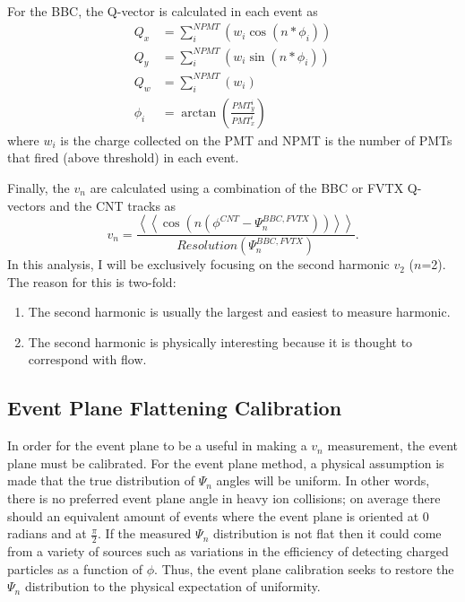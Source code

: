 For the BBC, the Q-vector is calculated in each event as
\begin{align}
Q_x &= \sum^{NPMT}_i( w_i \cos(n * \phi_i)) \\
Q_y &= \sum^{NPMT}_i( w_i \sin(n * \phi_i)) \\
Q_w &= \sum^{NPMT}_i( w_i ) \\
\phi_i &= \arctan(\frac{PMT_{y}^i}{PMT_{x}^i}) 
\label{eqn:bbc_ep_eqns}
\end{align}
where $w_i$ is the charge collected on the PMT and NPMT is the number of PMTs that fired (above threshold) in each event.

Finally, the $v_n$ are calculated using a combination of the BBC or FVTX Q-vectors and the CNT tracks as
\begin{equation}
v_n = \frac{\left<\left<\cos(n(\phi^{CNT} - \Psi^{BBC,FVTX}_n))\right>\right>}{Resolution(\Psi^{BBC,FVTX}_n)}.
\end{equation}
In this analysis, I will be exclusively focusing on the second harmonic $v_2$ ($n$=2). The reason for this is two-fold:
\begin{enumerate}
	\item{The second harmonic is usually the largest and easiest to measure harmonic.}
	\item{The second harmonic is physically interesting because it is thought to correspond with flow.}
\end{enumerate}
\subsection{Event Plane Flattening Calibration}
In order for the event plane to be a useful in making a $v_n$ measurement, the event plane must be calibrated. For the event plane method, a physical assumption is made that the true
distribution of $\Psi_n$ angles will be uniform. In other words, there is no preferred event plane angle in heavy ion collisions; on average there should an equivalent amount of events where the
event plane is oriented at 0 radians and at $\frac{\pi}{2}$. If the measured $\Psi_n$ distribution is not flat then it could come from a variety of sources such as variations in the efficiency of detecting charged particles as a function of $\phi$. Thus, the event plane calibration seeks to restore the $\Psi_n$ distribution to the physical expectation of uniformity.

